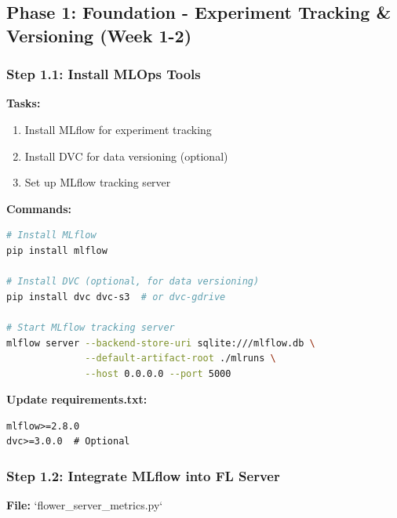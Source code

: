 \documentclass[12pt]{article}
\begin{document}
\subsection{Phase 1: Foundation - Experiment Tracking \& Versioning (Week 1-2)}

\subsubsection{Step 1.1: Install MLOps Tools}

\textbf{Tasks:}
\begin{enumerate}
    \item Install MLflow for experiment tracking
    \item Install DVC for data versioning (optional)
    \item Set up MLflow tracking server
\end{enumerate}

\textbf{Commands:}
\begin{lstlisting}[language=bash]
# Install MLflow
pip install mlflow

# Install DVC (optional, for data versioning)
pip install dvc dvc-s3  # or dvc-gdrive

# Start MLflow tracking server
mlflow server --backend-store-uri sqlite:///mlflow.db \
              --default-artifact-root ./mlruns \
              --host 0.0.0.0 --port 5000
\end{lstlisting}

\textbf{Update requirements.txt:}
\begin{lstlisting}[language=text]
mlflow>=2.8.0
dvc>=3.0.0  # Optional
\end{lstlisting}

\subsubsection{Step 1.2: Integrate MLflow into FL Server}

\textbf{File:} `flower_server_metrics.py`
\end{document}
